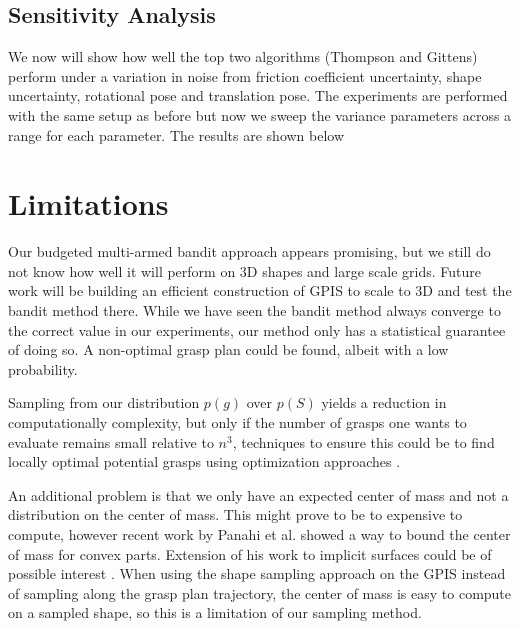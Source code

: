 \documentclass[letterpaper, 10 pt, conference]{ieeeconf}  %
\begin{document}
\subsection{Sensitivity Analysis }
We now will show how well the top two algorithms (Thompson and Gittens) perform under a variation in noise from friction coefficient uncertainty, shape uncertainty, rotational pose and translation pose. The experiments are performed with the same setup as before but now we sweep the variance parameters across a range for each parameter. The results are shown below 



\section{Limitations} 

Our budgeted multi-armed bandit approach appears promising, but we still do not know how well it will perform on 3D shapes and large scale grids. Future work will be building an efficient construction of GPIS to scale to 3D and test the bandit method there. While we have seen the bandit method always converge to the correct value in our experiments, our method only has a statistical guarantee of doing so. A non-optimal grasp plan could be found, albeit with a low probability. 

Sampling from our distribution $p(g)$ over $p(S)$ yields a reduction in computationally complexity, but only if the number of grasps one wants to evaluate remains small relative to $n^3$, techniques to ensure this could be to find locally optimal potential grasps using optimization approaches \cite{mahler2015opt}. 

An additional problem is that we only have an expected center of mass and not a distribution on the center of mass. This might prove to be to expensive to compute, however recent work by Panahi et al. showed a way to bound the center of mass for convex parts. Extension of his work to implicit surfaces could be of possible interest \cite{panahi2014bounding}.  When using the shape sampling approach on the GPIS instead of sampling along the grasp plan trajectory, the center of mass is easy to compute on a sampled shape, so this is a limitation of our sampling method.
\end{document}
